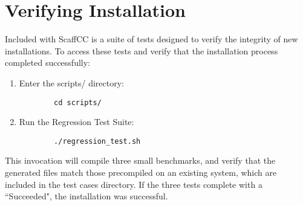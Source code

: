 \section{Verifying Installation}

Included with ScaffCC is a suite of tests designed to verify the integrity of new installations. To access these tests and verify that the installation process completed successfully:

\begin{enumerate}
    \item Enter the scripts/ directory:
    \begin{lstlisting}
        cd scripts/
    \end{lstlisting}
    \item Run the Regression Test Suite:
    \begin{lstlisting}
        ./regression_test.sh
    \end{lstlisting}
\end{enumerate}

This invocation will compile three small benchmarks, and verify that the generated files match those precompiled on an existing system, which are included in the test cases directory. If the three tests complete with a ``Succeeded", the installation was successful.
